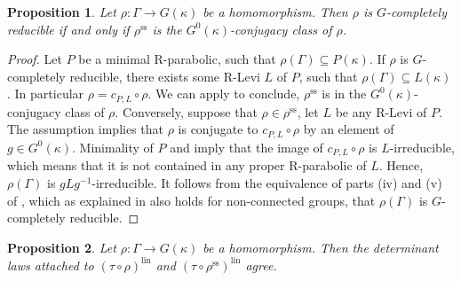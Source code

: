 \documentclass{amsart}
\newtheorem{prop}{Proposition}[section]
\theoremstyle{definition}
\theoremstyle{remark}
\newcommand{\semi}{\mathrm{ss}}
\newcommand{\lin}{\mathrm{lin}}
\begin{document}
\begin{prop}\label{crss} Let $\rho : \Gamma \to G(\kappa)$ be a homomorphism. Then $\rho$ is $G$-completely reducible if and only if $\rho^{\semi}$ is the $G^0(\kappa)$-conjugacy class of $\rho$.
\end{prop}

\begin{proof} 
Let $P$ be a minimal R-parabolic, such that $\rho(\Gamma) \subseteq P(\kappa)$. 
If $\rho$ is $G$-completely reducible, there exists some R-Levi $L$ of $P$, 
such that $\rho(\Gamma) \subseteq L(\kappa)$. 
In particular $\rho = c_{P,L} \circ \rho$. We can apply  to conclude, $\rho^{\semi}$ is in the
$G^0(\kappa)$-conjugacy class of $\rho$. Conversely, suppose that $\rho\in \rho^{\semi}$, let $L$ be any R-Levi
of $P$. The assumption implies that $\rho$ is conjugate to $c_{P,L}\circ \rho$ by an element of $g\in G^0(\kappa)$. Minimality of $P$ and \cite[Corollary 6.4]{BMR} imply that the image of $c_{P,L}\circ \rho$ is $L$-irreducible, which means that it is not  contained in any proper R-parabolic of $L$. Hence, $\rho(\Gamma)$ 
is $g L g^{-1}$-irreducible. It follows from the equivalence of parts (iv) and (v) of
\cite[Corollary 3.5]{BMR}, which as explained in \cite[Section 6.3]{BMR} also holds for non-connected groups, that $\rho(\Gamma)$ is $G$-completely reducible.
\end{proof}

\begin{prop}\label{same_det} Let $\rho : \Gamma \to G(\kappa)$ be a homomorphism. Then the determinant laws attached to $(\tau \circ \rho)^{\lin}$ and $(\tau \circ \rho^{\semi})^{\lin}$ agree.
\end{prop}
\end{document}
